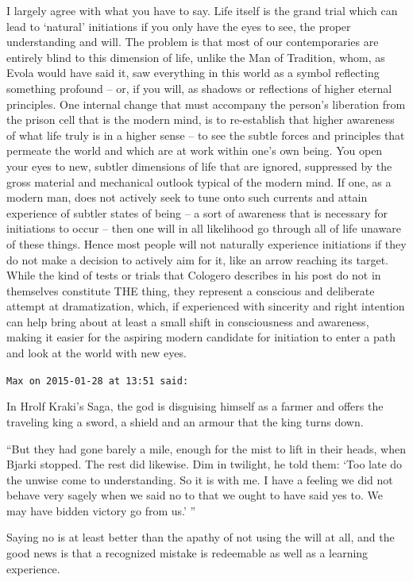 \begin{footnotesize}
\begin{sffamily}
I largely agree with what you have to say. Life itself is the grand trial which can lead to `natural' initiations if you only have the eyes to see, the proper understanding and will. The problem is that most of our contemporaries are entirely blind to this dimension of life, unlike the Man of Tradition, whom, as Evola would have said it, saw everything in this world as a symbol reflecting something profound -- or, if you will, as shadows or reflections of higher eternal principles. One internal change that must accompany the person's liberation from the prison cell that is the modern mind, is to re-establish that higher awareness of what life truly is in a higher sense -- to see the subtle forces and principles that permeate the world and which are at work within one's own being. You open your eyes to new, subtler dimensions of life that are ignored, suppressed by the gross material and mechanical outlook typical of the modern mind. If one, as a modern man, does not actively seek to tune onto such currents and attain experience of subtler states of being -- a sort of awareness that is necessary for initiations to occur -- then one will in all likelihood go through all of life unaware of these things. Hence most people will not naturally experience initiations if they do not make a decision to actively aim for it, like an arrow reaching its target. While the kind of tests or trials that Cologero describes in his post do not in themselves constitute THE thing, they represent a conscious and deliberate attempt at dramatization, which, if experienced with sincerity and right intention can help bring about at least a small shift in consciousness and awareness, making it easier for the aspiring modern candidate for initiation to enter a path and look at the world with new eyes.

\hfill

\texttt{Max on 2015-01-28 at 13:51 said:}

In Hrolf Kraki's Saga, the god is disguising himself as a farmer and offers the traveling king a sword, a shield and an armour that the king turns down.

``But they had gone barely a mile, enough for the mist to lift in their heads, when Bjarki stopped. The rest did likewise. Dim in twilight, he told them: `Too late do the unwise come to understanding. So it is with me. I have a feeling we did not behave very sagely when we said no to that we ought to have said yes to. We may have bidden victory go from us.' ''

Saying no is at least better than the apathy of not using the will at all, and the good news is that a recognized mistake is redeemable as well as a learning experience.


\end{sffamily}
\end{footnotesize}
